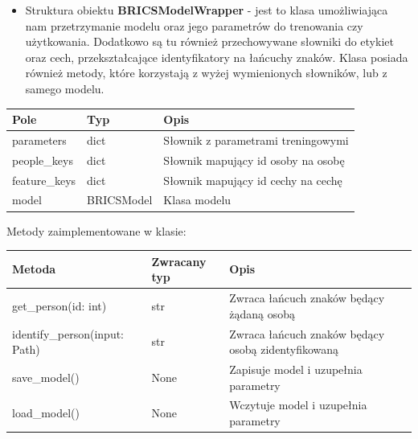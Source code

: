 \begin{itemize}
    \item Struktura obiektu \textbf{BRICSModelWrapper} - jest to klasa umożliwiająca nam przetrzymanie
    modelu oraz jego parametrów do trenowania czy użytkowania. Dodatkowo są tu również przechowywane
    słowniki do etykiet oraz cech, przekształcające identyfikatory na łańcuchy znaków.
    Klasa posiada również metody, które korzystają z wyżej wymienionych słowników, lub z samego
    modelu.  
\end{itemize}
\begin{center}
	\begin{tabular}{|l|l|l|}
		\hline
		Pole & Typ & Opis \\
		\hline
		parameters & dict & Słownik z parametrami treningowymi \\
		\hline
        people\_keys & dict & Słownik mapujący id osoby na osobę \\
		\hline
        feature\_keys & dict & Słownik mapujący id cechy na cechę \\
		\hline
        model & BRICSModel & Klasa modelu \\
		\hline
	\end{tabular}
\end{center}

Metody zaimplementowane w klasie:

\begin{center}
    \begin{tabular}{|l|l|l|}
		\hline
		Metoda & Zwracany typ & Opis \\
		\hline
		get\_person(id: int) & str & Zwraca łańcuch znaków będący żądaną osobą \\
		\hline
        identify\_person(input: Path) & str & Zwraca łańcuch znaków będący osobą zidentyfikowaną \\
		\hline
        save\_model() & None & Zapisuje model i uzupełnia parametry \\
		\hline
        load\_model() & None & Wczytuje model i uzupełnia parametry \\
		\hline
	\end{tabular}
\end{center}

